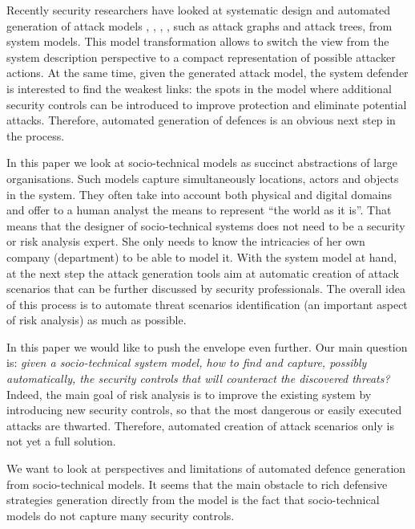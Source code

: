 \documentclass{llncs}
\begin{document}
Recently security researchers have looked at systematic design \cite{Paul-GraMSec-2014} and automated generation of attack models \cite{Ivanova-Generation-2014}, \cite{D3.4.1-2014}, \cite{Ou-CCS-2006}, \cite{Vigo-CSF-2014}, such as attack graphs and attack trees, from system models. This model transformation allows to switch the view from the system description perspective to a compact representation of possible attacker actions. At the same time, given the generated attack model, the system defender is interested to find the weakest links: the spots in the model where additional security controls can be introduced to improve protection and eliminate potential attacks. Therefore, automated generation of defences is an obvious next step in the process. 

In this paper we look at socio-technical models as succinct abstractions of large organisations. Such models capture simultaneously locations, actors and objects in the system. They often take into account both physical and digital domains and offer to a human analyst the means to represent ``the world as it is''. That means that the designer of socio-technical systems does not need to be a security or risk analysis expert. She only needs to know the intricacies of her own company (department) to be able to model it. With the system model at hand, at the next step the attack generation tools aim at automatic creation of attack scenarios that can be further discussed by security professionals. The overall idea of this process is to automate threat scenarios identification (an important aspect of risk analysis) as much as possible. 

In this paper we would like to push the envelope even further. Our main question is: \emph{given a socio-technical system model, how to find and capture, possibly automatically, the security controls that will counteract the discovered threats?} Indeed, the main goal of risk analysis is to improve the existing system by introducing new security controls, so that the most dangerous or easily executed attacks are thwarted. Therefore, automated creation of attack scenarios only is not yet a full solution. 

We want to look at perspectives and limitations of automated defence generation from socio-technical models. It seems that the main obstacle to rich defensive strategies generation directly from the model is the fact that socio-technical models do not capture many security controls.  
\end{document}
